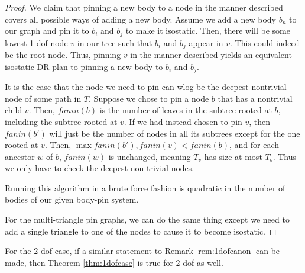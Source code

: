 \begin{proof}
    We claim that pinning a new body to a node in the manner described covers all possible ways of adding a new body. Assume we add a new body $b_n$ to our graph and pin it to $b_i$ and $b_j$ to make it isostatic. Then, there will be some lowest 1-dof node $v$ in our tree such that $b_i$ and $b_j$ appear in $v$. This could indeed be the root node. Thus, pinning $v$ in the manner described yields an equivalent isostatic DR-plan to pinning a new body to $b_i$ and $b_j$. 

    It is the case that the node we need to pin can wlog be the deepest nontrivial node of some path in $T$. Suppose we chose to pin a node $b$ that has a nontrivial child $v$. Then, $fanin(b)$ is the number of leaves in the subtree rooted at $b$, including the subtree rooted at $v$. If we had instead chosen to pin $v$, then $fanin(b')$ will just be the number of nodes in all its subtrees except for the one rooted at $v$. Then, $\max{fanin(b'),fanin(v)} < fanin(b)$, and for each ancestor $w$ of $b$, $fanin(w)$ is unchanged, meaning $T_v$ has size at most $T_b$. Thus we only have to check the deepest non-trivial nodes.

    Running this algorithm in a brute force fashion is quadratic in the number of bodies of our given body-pin system.

    For the multi-triangle pin graphs, we can do the same thing except we need to add a single triangle to one of the nodes to cause it to become isostatic.

\end{proof}


\begin{observation}
    For the 2-dof case, if a similar statement to Remark \ref{rem:1dofcanon} can be made, then Theorem \ref{thm:1dofcase} is true for 2-dof as well.
\end{observation}

